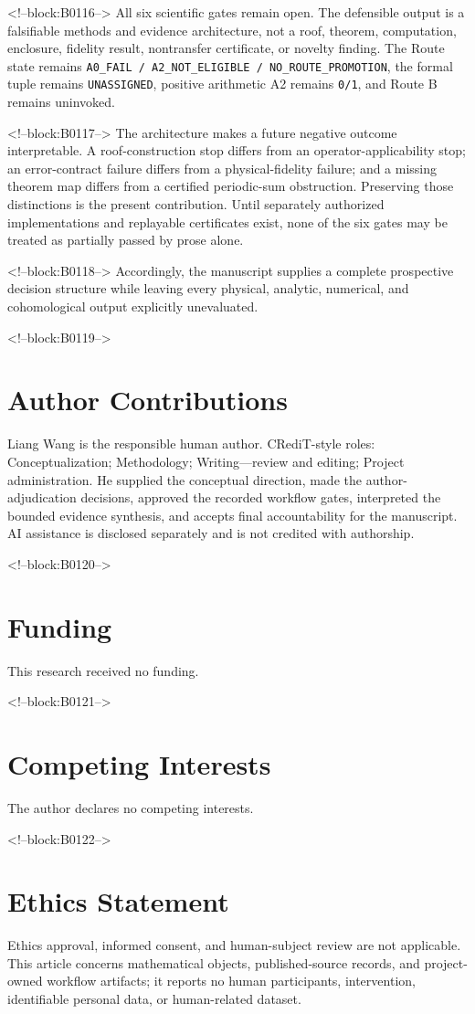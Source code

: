 \documentclass[11pt,a4paper]{article}
\begin{document}
<!--block:B0116-->
All six scientific gates remain open. The defensible output is a falsifiable methods and evidence architecture, not a roof, theorem, computation, enclosure, fidelity result, nontransfer certificate, or novelty finding. The Route state remains \texttt{A0\_FAIL\ /\ A2\_NOT\_ELIGIBLE\ /\ NO\_ROUTE\_PROMOTION}, the formal tuple remains \texttt{UNASSIGNED}, positive arithmetic A2 remains \texttt{0/1}, and Route B remains uninvoked.

<!--block:B0117-->
The architecture makes a future negative outcome interpretable. A roof-construction stop differs from an operator-applicability stop; an error-contract failure differs from a physical-fidelity failure; and a missing theorem map differs from a certified periodic-sum obstruction. Preserving those distinctions is the present contribution. Until separately authorized implementations and replayable certificates exist, none of the six gates may be treated as partially passed by prose alone.

<!--block:B0118-->
Accordingly, the manuscript supplies a complete prospective decision structure while leaving every physical, analytic, numerical, and cohomological output explicitly unevaluated.

<!--block:B0119-->
\section*{Author Contributions}
Liang Wang is the responsible human author. CRediT-style roles: Conceptualization; Methodology; Writing---review and editing; Project administration. He supplied the conceptual direction, made the author-adjudication decisions, approved the recorded workflow gates, interpreted the bounded evidence synthesis, and accepts final accountability for the manuscript. AI assistance is disclosed separately and is not credited with authorship.

<!--block:B0120-->
\section*{Funding}
This research received no funding.

<!--block:B0121-->
\section*{Competing Interests}
The author declares no competing interests.

<!--block:B0122-->
\section*{Ethics Statement}
Ethics approval, informed consent, and human-subject review are not applicable. This article concerns mathematical objects, published-source records, and project-owned workflow artifacts; it reports no human participants, intervention, identifiable personal data, or human-related dataset.
\end{document}
